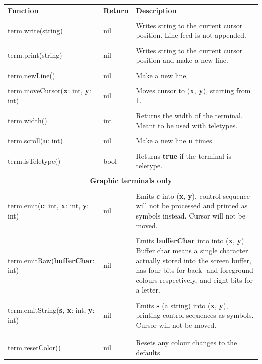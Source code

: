 \documentclass[10pt, stock]{memoir}
\begin{document}
\begin{tabularx}{\textwidth}{l l X}
	\textbf{\large Function} & \textbf{\large Return} & \textbf{\large Description}
	\\ \\
	\endhead
	term.write(string) & nil & Writes string to the current cursor position. Line feed is not appended.
	\\ \\
	term.print(string) & nil & Writes string to the current cursor position and make a new line.
	\\ \\
	term.newLine() & nil & Make a new line.
	\\ \\
	term.moveCursor(\textbf{x}: int, \textbf{y}: int) & nil & Moves cursor to (\textbf{x}, \textbf{y}), starting from 1.
	\\ \\
	term.width() & int & Returns the width of the terminal. Meant to be used with teletypes.
	\\ \\
	term.scroll(\textbf{n}: int) & nil & Make a new line \textbf{n} times.
	\\ \\
	term.isTeletype() & bool & Returns \textbf{true} if the terminal is teletype.
	\\ \\
	\multicolumn{3}{c}{\textbf{Graphic terminals only}}
	\\ \\
	term.emit(\textbf{c}: int, \textbf{x}: int, \textbf{y}: int) & nil & Emits \textbf{c} into (\textbf{x}, \textbf{y}), control sequence will not be processed and printed as symbols instead. Cursor will not be moved.
	\\ \\
	term.emitRaw(\textbf{bufferChar}: int) & nil & Emits \textbf{bufferChar} into into (\textbf{x}, \textbf{y}). Buffer char means a single character actually stored into the screen buffer, has four bits for back- and foreground colours respectively, and eight bits for a letter.
	\\ \\
	term.emitString(\textbf{s}, \textbf{x}: int, \textbf{y}: int) & nil & Emits \textbf{s} (a string) into (\textbf{x}, \textbf{y}), printing control sequences as symbols. Cursor will not be moved.
	\\ \\
	\begin{tabular}[t]{@{}l@{}}term.resetColour()\\term.resetColor()\end{tabular} & nil & Resets any colour changes to the defaults.

\end{tabularx}
\end{document}
